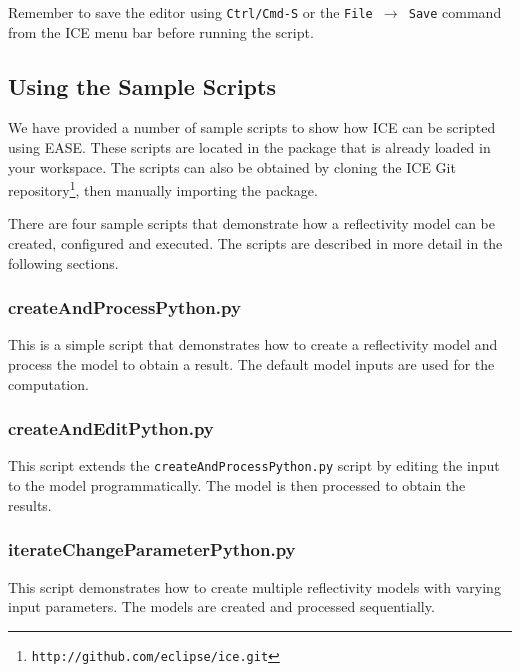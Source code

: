 Remember to save the editor using \texttt{Ctrl/Cmd-S} or the \texttt{File
$\rightarrow$ Save} command from the ICE menu bar before running the script.

\subsection{Using the Sample Scripts}

\lstset{basicstyle=\ttfamily\scriptsize, breaklines}
\makeatletter
\def\lst@lettertrue{\let\lst@ifletter\iffalse}
\makeatother

We have provided a number of sample scripts to show how ICE can be
scripted using EASE.
These scripts are located in the
 package that is already loaded
in your workspace. The scripts can also be obtained by cloning the ICE Git
repository\footnote{\texttt{http://github.com/eclipse/ice.git}},
then manually importing the 
package.

There are four sample scripts that demonstrate how a reflectivity model
can be created, configured and executed. The scripts are described in
more detail in the following sections.

\subsubsection{createAndProcessPython.py} 

This is a simple script
that demonstrates how to create a reflectivity model and process the model to
obtain a result. The default model inputs are used for the computation.



\subsubsection{createAndEditPython.py} 

This script extends the
\texttt{createAndProcessPython.py} script by editing the input to the model
programmatically. The model is then processed to obtain the results.



\subsubsection{iterateChangeParameterPython.py} 
This script demonstrates how to create
multiple reflectivity models with varying input parameters. The models are created
and processed sequentially.

